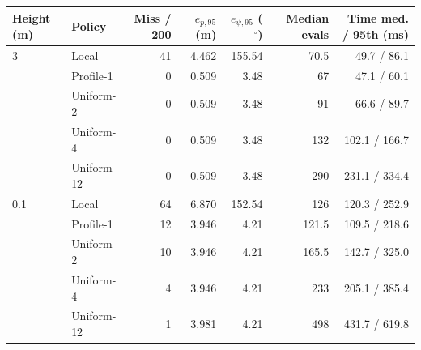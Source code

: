 \begin{tabular}{llrrrrr}
\toprule
Height (m)&Policy&Miss / 200&$e_{p,95}$ (m)&$e_{\psi,95}$ ($^\circ$)&Median evals&Time med. / 95th (ms)\\
\midrule
3&Local&41&4.462&155.54&70.5&49.7 / 86.1\\
&Profile-1&0&0.509&3.48&67&47.1 / 60.1\\
&Uniform-2&0&0.509&3.48&91&66.6 / 89.7\\
&Uniform-4&0&0.509&3.48&132&102.1 / 166.7\\
&Uniform-12&0&0.509&3.48&290&231.1 / 334.4\\
\midrule
0.1&Local&64&6.870&152.54&126&120.3 / 252.9\\
&Profile-1&12&3.946&4.21&121.5&109.5 / 218.6\\
&Uniform-2&10&3.946&4.21&165.5&142.7 / 325.0\\
&Uniform-4&4&3.946&4.21&233&205.1 / 385.4\\
&Uniform-12&1&3.981&4.21&498&431.7 / 619.8\\
\bottomrule
\end{tabular}
